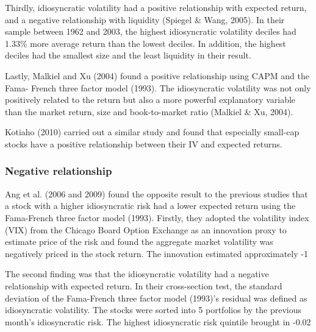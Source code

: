 Thirdly, idiosyncratic volatility had a positive relationship with expected return, and a negative relationship with liquidity (Spiegel & Wang, 2005). In their sample between 1962 and 2003, the highest idiosyncratic volatility deciles had 1.33\% more average return than the lowest deciles. In addition, the highest deciles had the smallest size and the least liquidity in their result.
 
Lastly, Malkiel and Xu (2004) found a positive relationship using CAPM and the Fama- French three factor model (1993). The idiosyncratic volatility was not only positively related to the return but also a more powerful explanatory variable than the market return, size and book-to-market ratio (Malkiel & Xu, 2004).

Kotiaho (2010) carried out a similar study and found that especially small-cap stocks have a positive relationship between their IV and expected returns.

\subsubsection{Negative relationship}

Ang et al. (2006 and 2009) found the opposite result to the previous studies that a stock with a higher idiosyncratic risk had a lower expected return using the Fama-French three factor model (1993). Firstly, they adopted the volatility index (VIX) from the Chicago Board Option Exchange as an innovation proxy to estimate price of the risk and found the aggregate market volatility was negatively priced in the stock return. The innovation estimated approximately -1%

The second finding was that the idiosyncratic volatility had a negative relationship with expected return. In their cross-section test, the standard deviation of the Fama-French three factor model (1993)’s residual was defined as idiosyncratic volatility. The stocks were sorted into 5 portfolios by the previous month’s idiosyncratic risk. The highest idiosyncratic risk quintile brought in -0.02%



